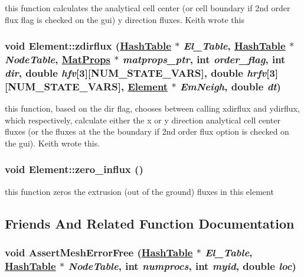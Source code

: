 this function calculates the analytical cell center (or cell boundary if 2nd order flux flag is checked on the gui) y direction fluxes. Keith wrote this 

\hypertarget{classElement_a75}{
\subsubsection[zdirflux]{\setlength{\rightskip}{0pt plus 5cm}void Element::zdirflux (\hyperlink{classHashTable}{Hash\-Table} $\ast$ {\em El\_\-Table}, \hyperlink{classHashTable}{Hash\-Table} $\ast$ {\em Node\-Table}, \hyperlink{structMatProps}{Mat\-Props} $\ast$ {\em matprops\_\-ptr}, int {\em order\_\-flag}, int {\em dir}, double {\em hfv}\mbox{[}3\mbox{]}\mbox{[}NUM\_\-STATE\_\-VARS\mbox{]}, double {\em hrfv}\mbox{[}3\mbox{]}\mbox{[}NUM\_\-STATE\_\-VARS\mbox{]}, \hyperlink{classElement}{Element} $\ast$ {\em Em\-Neigh}, double {\em dt})}}
\label{classElement_a75}


this function, based on the dir flag, chooses between calling xdirflux and ydirflux, which respectively, calculate either the x or y direction analytical cell center fluxes (or the fluxes at the the boundary if 2nd order flux option is checked on the gui). Keith wrote this. 

\hypertarget{classElement_a108}{
\subsubsection[zero\_\-influx]{\setlength{\rightskip}{0pt plus 5cm}void Element::zero\_\-influx ()}}
\label{classElement_a108}


this function zeros the extrusion (out of the ground) fluxes in this element 



\subsection{Friends And Related Function Documentation}
\hypertarget{classElement_n1}{
\subsubsection[AssertMeshErrorFree]{\setlength{\rightskip}{0pt plus 5cm}void Assert\-Mesh\-Error\-Free (\hyperlink{classHashTable}{Hash\-Table} $\ast$ {\em El\_\-Table}, \hyperlink{classHashTable}{Hash\-Table} $\ast$ {\em Node\-Table}, int {\em numprocs}, int {\em myid}, double {\em loc})}}
\label{classElement_n1}


